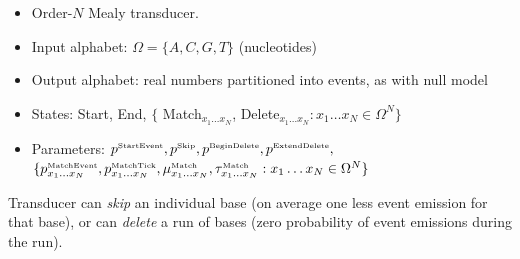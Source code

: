 \documentclass[10pt]{article}
\begin{document}
\begin{itemize}
\item Order-$N$ Mealy transducer.
\item Input alphabet: $\Omega = \{ A, C, G, T \}$ (nucleotides)
\item Output alphabet: real numbers partitioned into events, as with null model
\item States: Start, End, $\{$ Match${}_{x_1 \ldots x_N}$, Delete${}_{x_1 \ldots x_N}: x_1 \ldots x_N \in \Omega^N \}$
\item Parameters:
$p^{\mbox{\tiny StartEvent}}, p^{\mbox{\tiny Skip}}, p^{\mbox{\tiny BeginDelete}}, p^{\mbox{\tiny ExtendDelete}},$ \\
$\{ p^{\mbox{\tiny MatchEvent}}_{x_1\ldots x_N}, p^{\mbox{\tiny MatchTick}}_{x_1\ldots x_N}, \mu^{\mbox{\tiny Match}}_{x_1\ldots x_N},\tau^{\mbox{\tiny Match}}_{x_1\ldots x_N} : x_1 \ldots x_N \in \Omega^N \}$
\end{itemize}

Transducer can {\em skip} an individual base (on average one less event emission for that base),
or can {\em delete} a run of bases (zero probability of event emissions during the run).
\end{document}

